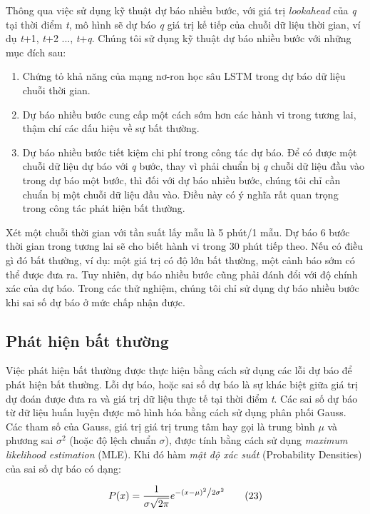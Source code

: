 Thông qua việc sử dụng kỹ thuật dự báo nhiều bước, với giá trị \textit{lookahead} của \textit{q} tại thời điểm \textit{t}, mô hình sẽ dự báo \textit{q} giá trị kế tiếp của chuỗi dữ liệu thời gian, ví dụ \textit{t}+1, \textit{t}+2 ..., \textit{t}+\textit{q}. Chúng tôi sử dụng kỹ thuật dự báo nhiều bước với những mục đích sau:

\begin{enumerate}
\item Chứng tỏ khả năng của mạng nơ-ron học sâu LSTM trong dự báo dữ liệu chuỗi thời gian.
\item Dự báo nhiều bước cung cấp một cách sớm hơn các hành vi trong tương lai, thậm chí các dấu hiệu về sự bất thường.
\item Dự báo nhiều bước tiết kiệm chi phí trong công tác dự báo. Để có được một chuỗi dữ liệu dự báo với \textit{q} bước, thay vì phải chuẩn bị \textit{q} chuỗi dữ liệu đầu vào trong dự báo một bước, thì đối với dự báo nhiều bước, chúng tôi chỉ cần chuẩn bị một chuỗi dữ liệu đầu vào. Điều này có ý nghĩa rất quan trọng trong công tác phát hiện bất thường.
\end{enumerate}

Xét một chuỗi thời gian với tần suất lấy mẫu là 5 phút/1 mẫu. Dự báo 6 bước thời gian trong tương lai sẽ cho biết hành vi trong 30 phút tiếp theo. Nếu có điều gì đó bất thường, ví dụ: một giá trị có độ lớn bất thường, một cảnh báo sớm có thể được đưa ra. Tuy nhiên, dự báo nhiều bước cũng phải đánh đổi với độ chính xác của dự báo.  Trong các thử nghiệm, chúng tôi chỉ sử dụng dự báo nhiều bước khi sai số dự báo ở mức chấp nhận được.

\subsection{Phát hiện bất thường}
Việc phát hiện bất thường được thực hiện bằng cách sử dụng các lỗi dự báo để phát hiện bất thường. Lỗi dự báo, hoặc sai số dự báo là sự khác biệt giữa giá trị dự đoán được đưa ra và giá trị dữ liệu thực tế tại thời điểm \textit{t}. Các sai số dự báo từ dữ liệu huấn luyện được mô hình hóa bằng cách sử dụng phân phối Gauss. Các tham số của Gauss, giá trị giá trị trung tâm hay gọi là trung bình $\mu$ và phương sai $\sigma^{2}$ (hoặc độ lệch chuẩn $\sigma$), được tính bằng cách sử dụng \textit{maximum likelihood estimation} (MLE). Khi đó hàm \textit{mật độ xác suất} (Probability Densities) của sai số dự báo có dạng:

\begin{equation}
\label{eq:23}
P(x) = \frac{1}{{\sigma \sqrt {2\pi } }}e^{{{ - \left( {x - \mu } \right)^2 } \mathord{\left/ {\vphantom {{ - \left( {x - \mu } \right)^2 } {2\sigma ^2 }}} \right. \kern-\nulldelimiterspace} {2\sigma ^2 }}}
\tag{23}
\end{equation}

